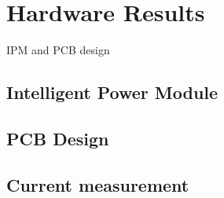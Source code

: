 \section{Hardware Results}

IPM and PCB design 

\subsection{Intelligent Power Module}

\subsection{PCB Design}


\subsection{Current measurement}

\newpage